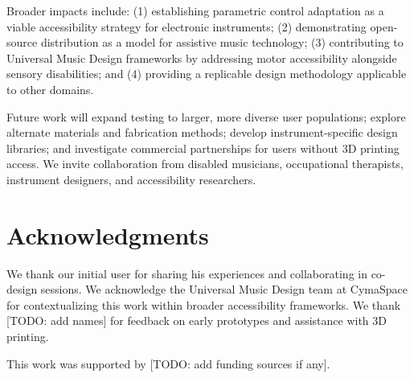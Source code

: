 \documentclass[sigconf]{nimeart}
\begin{document}
Broader impacts include: (1) establishing parametric control adaptation as a viable accessibility strategy for electronic instruments; (2) demonstrating open-source distribution as a model for assistive music technology; (3) contributing to Universal Music Design frameworks by addressing motor accessibility alongside sensory disabilities; and (4) providing a replicable design methodology applicable to other domains.

Future work will expand testing to larger, more diverse user populations; explore alternate materials and fabrication methods; develop instrument-specific design libraries; and investigate commercial partnerships for users without 3D printing access. We invite collaboration from disabled musicians, occupational therapists, instrument designers, and accessibility researchers.

\section{Acknowledgments}


We thank our initial user for sharing his experiences and collaborating in co-design sessions. We acknowledge the Universal Music Design team at CymaSpace for contextualizing this work within broader accessibility frameworks. We thank [TODO: add names] for feedback on early prototypes and assistance with 3D printing.

This work was supported by [TODO: add funding sources if any].
\end{document}
